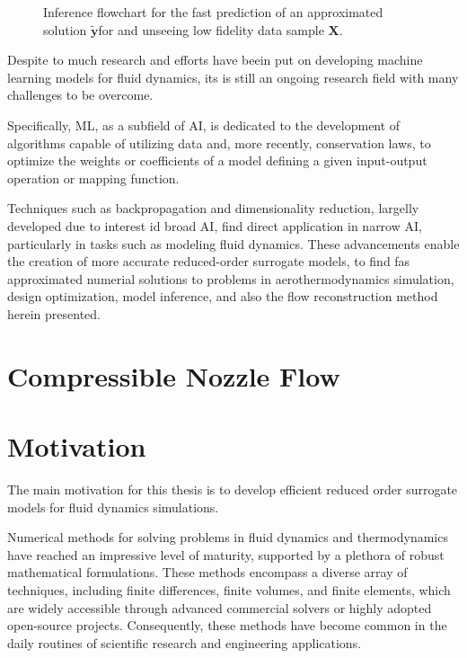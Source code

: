 \begin{figure}[ht]
	\caption{Inference flowchart for the fast prediction of an approximated solution $\mathbf{\tilde y}$for and unseeing low fidelity data sample $\mathbf{X}$.}
	\label{fig:learned_flowchart}
	
	\end{figure}

Despite to much research and efforts have beein put on developing machine learning models for fluid dynamics, its is still an ongoing research field with many challenges to be overcome.

Specifically, ML, as a subfield of AI, is dedicated to the development of algorithms capable of utilizing data and, more recently, conservation laws, to  optimize the weights or coefficients of a model defining a given input-output operation or mapping function.

Techniques such as backpropagation and dimensionality reduction, largelly developed due to interest id broad AI, find direct application in narrow AI, particularly in tasks such as modeling fluid dynamics. These advancements enable the creation of more accurate reduced-order surrogate models, to find fas approximated numerial solutions to problems in aerothermodynamics simulation, design optimization, model inference, and also the flow reconstruction method herein presented.

\section{Compressible Nozzle Flow}


\section{Motivation}

The main motivation for this thesis is to develop efficient reduced order surrogate models for fluid dynamics simulations. 

Numerical methods for solving problems in fluid dynamics and thermodynamics have reached an impressive level of maturity, supported by a plethora of robust mathematical formulations. These methods encompass a diverse array of techniques, including finite differences, finite volumes, and finite elements, which are widely accessible through advanced commercial solvers or highly adopted open-source projects. Consequently, these methods have become common in the daily routines of scientific research and engineering applications.

